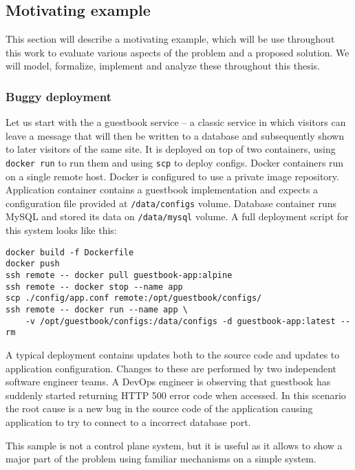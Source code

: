 \subsection{Motivating example}\label{sec:motivating-examples}

This section will describe a motivating example, which will be use throughout this work to evaluate various aspects of the problem and a proposed solution. We will model, formalize, implement and analyze these throughout this thesis.


\subsubsection{Buggy deployment}\label{sec:motivating-ex1}

Let us start with the a guestbook service -- a classic service in which visitors can leave a message that will then be written to a database and subsequently shown to later visitors of the same site. It is deployed on top of two containers, using \texttt{docker run} to run them and using \texttt{scp} to deploy configs. Docker containers run on a single remote host. Docker is configured to use a private image repository. Application container contains a guestbook implementation and expects a configuration file provided at \texttt{/data/configs} volume. Database container runs MySQL and stored its data on \texttt{/data/mysql} volume. A full deployment script for this system looks like this:
%
\begin{verbatim}
docker build -f Dockerfile
docker push
ssh remote -- docker pull guestbook-app:alpine
ssh remote -- docker stop --name app
scp ./config/app.conf remote:/opt/guestbook/configs/
ssh remote -- docker run --name app \
    -v /opt/guestbook/configs:/data/configs -d guestbook-app:latest --rm
\end{verbatim}

A typical deployment contains updates both to the source code and updates to application configuration. Changes to these are performed by two independent software engineer teams. A DevOps engineer is observing that guestbook has suddenly started returning HTTP 500 error code when accessed. In this scenario the root cause is a new bug in the source code of the application causing application to try to connect to a incorrect database port.

This sample is not a control plane system, but it is useful as it allows to show a major part of the problem using familiar mechanisms on a simple system.

